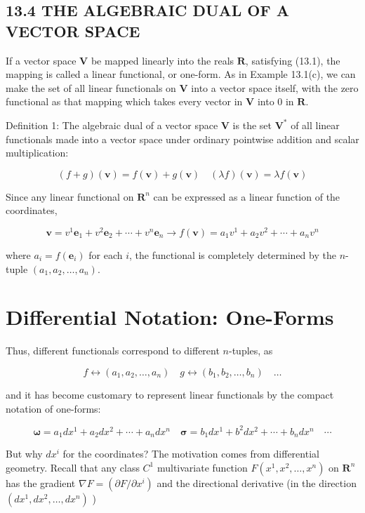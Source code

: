 \documentclass[10pt]{article}
\begin{document}
\subsection*{13.4 THE ALGEBRAIC DUAL OF A VECTOR SPACE}
If a vector space $\mathbf{V}$ be mapped linearly into the reals $\mathbf{R}$, satisfying (13.1), the mapping is called a linear functional, or one-form. As in Example 13.1(c), we can make the set of all linear functionals on $\mathbf{V}$ into a vector space itself, with the zero functional as that mapping which takes every vector in $\mathbf{V}$ into 0 in $\mathbf{R}$.

Definition 1: The algebraic dual of a vector space $\mathbf{V}$ is the set $\mathbf{V}^{*}$ of all linear functionals made into a vector space under ordinary pointwise addition and scalar multiplication:

$$
(f+g)(\mathbf{v})=f(\mathbf{v})+g(\mathbf{v}) \quad(\lambda f)(\mathbf{v})=\lambda f(\mathbf{v})
$$

Since any linear functional on $\mathbf{R}^{n}$ can be expressed as a linear function of the coordinates,

$$
\mathbf{v}=v^{1} \mathbf{e}_{1}+v^{2} \mathbf{e}_{2}+\cdots+v^{n} \mathbf{e}_{n} \rightarrow f(\mathbf{v})=a_{1} v^{1}+a_{2} v^{2}+\cdots+a_{n} v^{n}
$$

where $a_{i}=f\left(\mathbf{e}_{i}\right)$ for each $i$, the functional is completely determined by the $n$-tuple $\left(a_{1}, a_{2}, \ldots, a_{n}\right)$.

\section*{Differential Notation: One-Forms}
Thus, different functionals correspond to different $n$-tuples, as

$$
f \leftrightarrow\left(a_{1}, a_{2}, \ldots, a_{n}\right) \quad g \leftrightarrow\left(b_{1}, b_{2}, \ldots, b_{n}\right) \quad \ldots
$$

and it has become customary to represent linear functionals by the compact notation of one-forms:

$$
\boldsymbol{\omega}=a_{1} d x^{1}+a_{2} d x^{2}+\cdots+a_{n} d x^{n} \quad \boldsymbol{\sigma}=b_{1} d x^{1}+b^{2} d x^{2}+\cdots+b_{n} d x^{n} \quad \cdots
$$

But why $d x^{i}$ for the coordinates? The motivation comes from differential geometry. Recall that any class $C^{1}$ multivariate function $F\left(x^{1}, x^{2}, \ldots, x^{n}\right)$ on $\mathbf{R}^{n}$ has the gradient $\nabla F=\left(\partial F / \partial x^{i}\right)$ and the directional derivative (in the direction $\left(d x^{1}, d x^{2}, \ldots, d x^{n}\right)$ )
\end{document}
